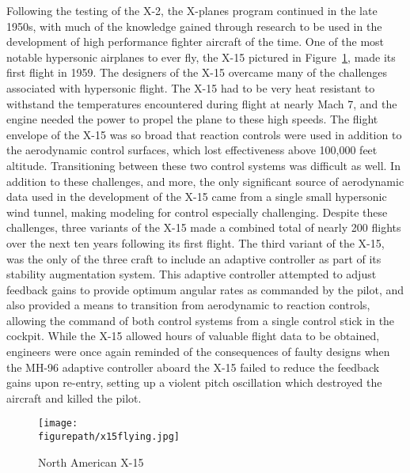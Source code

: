 Following the testing of the X-2, the X-planes program continued in the late 1950s, with much of the knowledge gained through research to be used in the development of high performance fighter aircraft of the time.
One of the most notable hypersonic airplanes to ever fly, the X-15 pictured in Figure~\ref{fig:x15flying}, made its first flight in 1959.
The designers of the X-15 overcame many of the challenges associated with hypersonic flight.
The X-15 had to be very heat resistant to withstand the temperatures encountered during flight at nearly Mach 7, and the engine needed the power to propel the plane to these high speeds.
The flight envelope of the X-15 was so broad that reaction controls were used in addition to the aerodynamic control surfaces, which lost effectiveness above 100,000 feet altitude.
Transitioning between these two control systems was difficult as well.
In addition to these challenges, and more, the only significant source of aerodynamic data used in the development of the X-15 came from a single small hypersonic wind tunnel, making modeling for control especially challenging.
Despite these challenges, three variants of the X-15 made a combined total of nearly 200 flights over the next ten years following its first flight.
The third variant of the X-15, was the only of the three craft to include an adaptive controller as part of its stability augmentation system.
This adaptive controller attempted to adjust feedback gains to provide optimum angular rates as commanded by the pilot, and also provided a means to transition from aerodynamic to reaction controls, allowing the command of both control systems from a single control stick in the cockpit.
While the X-15 allowed hours of valuable flight data to be obtained, engineers were once again reminded of the consequences of faulty designs when the MH-96 adaptive controller aboard the X-15 failed to reduce the feedback gains upon re-entry, setting up a violent pitch oscillation which destroyed the aircraft and killed the pilot.

 \begin{figure}[h]
  \begin{center}
    \texttt{[image: \\figurepath/x15flying.jpg]}
    \caption{North American X-15\label{fig:x15flying}}
  \end{center}
\end{figure}

